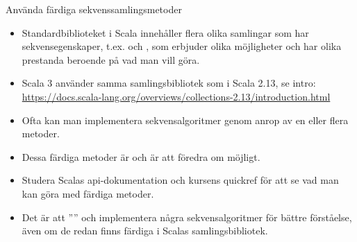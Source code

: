 \begin{Slide}{Använda färdiga sekvenssamlingsmetoder}
\begin{itemize}\SlideFontSmall
\item Standardbiblioteket i Scala innehåller flera olika samlingar som har sekvensegenskaper, t.ex.  och , som erbjuder olika möjligheter och har olika prestanda beroende på vad man vill göra.
\item Scala 3 använder samma samlingsbibliotek som i Scala 2.13, se intro:  \url{https://docs.scala-lang.org/overviews/collections-2.13/introduction.html} 

\item Ofta kan man implementera sekvensalgoritmer genom anrop av en eller flera  metoder.

\item Dessa färdiga metoder är  och är att föredra om möjligt.

\item Studera Scalas api-dokumentation och kursens quickref för att se vad man kan göra med färdiga metoder.

\item Det är  att '''' och implementera några sekvensalgoritmer  för bättre förståelse, även om de redan finns färdiga i Scalas samlingsbibliotek.

\end{itemize}
\end{Slide}



